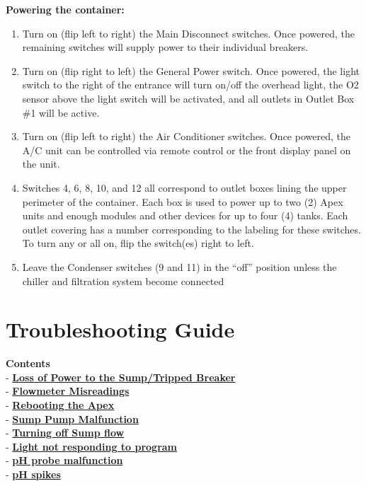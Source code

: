 \documentclass[]{book}
\providecommand{\tightlist}{%
  \setlength{\itemsep}{0pt}\setlength{\parskip}{0pt}}
\begin{document}
\textbf{Powering the container:}

\begin{enumerate}
\def\labelenumi{\arabic{enumi}.}
\tightlist
\item
  Turn on (flip left to right) the Main Disconnect switches. Once
  powered, the remaining switches will supply power to their individual
  breakers.
\item
  Turn on (flip right to left) the General Power switch. Once powered,
  the light switch to the right of the entrance will turn on/off the
  overhead light, the O2 sensor above the light switch will be
  activated, and all outlets in Outlet Box \#1 will be active.
\item
  Turn on (flip left to right) the Air Conditioner switches. Once
  powered, the A/C unit can be controlled via remote control or the
  front display panel on the unit.
\item
  Switches 4, 6, 8, 10, and 12 all correspond to outlet boxes lining the
  upper perimeter of the container. Each box is used to power up to two
  (2) Apex units and enough modules and other devices for up to four (4)
  tanks. Each outlet covering has a number corresponding to the labeling
  for these switches. To turn any or all on, flip the switch(es) right
  to left.
\item
  Leave the Condenser switches (9 and 11) in the ``off'' position unless
  the chiller and filtration system become connected
\end{enumerate}

\chapter{Troubleshooting Guide}\label{troubleshooting-guide}

\textbf{Contents}\\
- \protect\hyperlink{Tripped_Breaker}{\textbf{Loss of Power to the
Sump/Tripped Breaker}}\\
- \protect\hyperlink{Flowmeter_Misreadings}{\textbf{Flowmeter
Misreadings}}\\
- \protect\hyperlink{Reboot_Apex}{\textbf{Rebooting the Apex}}\\
- \protect\hyperlink{Sump_Pump_Malfunction}{\textbf{Sump Pump
Malfunction}}\\
- \protect\hyperlink{Turn_off_Sump_Flow}{\textbf{Turning off Sump
flow}}\\
- \protect\hyperlink{Light_OFF}{\textbf{Light not responding to
program}}\\
- \protect\hyperlink{pH_Probe_Malfunction}{\textbf{pH probe
malfunction}}\\
- \protect\hyperlink{pH_spikes}{\textbf{pH spikes}}
\end{document}
